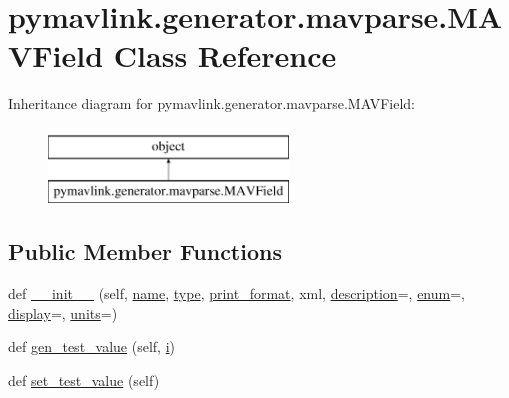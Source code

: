 \hypertarget{classpymavlink_1_1generator_1_1mavparse_1_1MAVField}{}\section{pymavlink.\+generator.\+mavparse.\+M\+A\+V\+Field Class Reference}
\label{classpymavlink_1_1generator_1_1mavparse_1_1MAVField}
Inheritance diagram for pymavlink.\+generator.\+mavparse.\+M\+A\+V\+Field\+:\begin{figure}[H]
\begin{center}
\leavevmode
\includegraphics[height=2.000000cm]{classpymavlink_1_1generator_1_1mavparse_1_1MAVField}
\end{center}
\end{figure}
\subsection*{Public Member Functions}
\begin{DoxyCompactItemize}
\item 
def \mbox{\hyperlink{classpymavlink_1_1generator_1_1mavparse_1_1MAVField_a55ec48db78bca01e1bd6b9b1eedbd1d3}{\+\_\+\+\_\+init\+\_\+\+\_\+}} (self, \mbox{\hyperlink{classpymavlink_1_1generator_1_1mavparse_1_1MAVField_ad636436d0d81c4e54194aaf5c24ace5e}{name}}, \mbox{\hyperlink{classpymavlink_1_1generator_1_1mavparse_1_1MAVField_aaa2d333fb1da3b04d3ffae7122f4205b}{type}}, \mbox{\hyperlink{classpymavlink_1_1generator_1_1mavparse_1_1MAVField_a8edb675a1e308a85270a3f1fe13022c1}{print\+\_\+format}}, xml, \mbox{\hyperlink{classpymavlink_1_1generator_1_1mavparse_1_1MAVField_a2f5084d72c4c52a93d65742e73a83557}{description}}=\textquotesingle{}\textquotesingle{}, \mbox{\hyperlink{classpymavlink_1_1generator_1_1mavparse_1_1MAVField_ad3e270468f22ebea9a3f2e6150ac42b5}{enum}}=\textquotesingle{}\textquotesingle{}, \mbox{\hyperlink{classpymavlink_1_1generator_1_1mavparse_1_1MAVField_a216925a287f997c02ed5b4afdf686a62}{display}}=\textquotesingle{}\textquotesingle{}, \mbox{\hyperlink{classpymavlink_1_1generator_1_1mavparse_1_1MAVField_a945c22c5e49d09b90217c28f23825e6a}{units}}=\textquotesingle{}\textquotesingle{})
\item 
def \mbox{\hyperlink{classpymavlink_1_1generator_1_1mavparse_1_1MAVField_a2df3d68699c4466c5b0523c7426703e8}{gen\+\_\+test\+\_\+value}} (self, \mbox{\hyperlink{velTest_8cpp_a1239420b8759f52cbab64225b82461e2}{i}})
\item 
def \mbox{\hyperlink{classpymavlink_1_1generator_1_1mavparse_1_1MAVField_a8f6649ad27b22034662c7eea24aba304}{set\+\_\+test\+\_\+value}} (self)
\end{DoxyCompactItemize}
